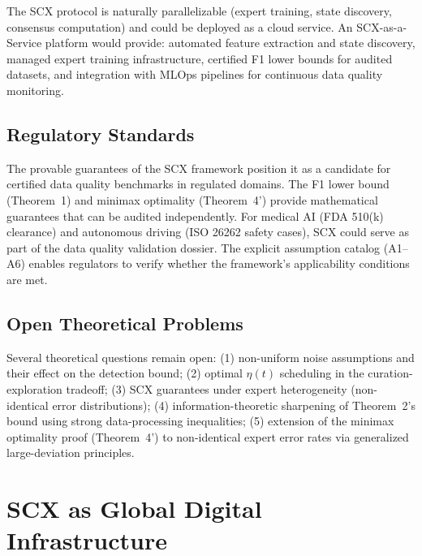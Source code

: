 \documentclass[twocolumn]{article}
\theoremstyle{definition}
\begin{document}
The SCX protocol is naturally parallelizable (expert training, state discovery, consensus computation) and could be deployed as a cloud service. An SCX-as-a-Service platform would provide: automated feature extraction and state discovery, managed expert training infrastructure, certified F1 lower bounds for audited datasets, and integration with MLOps pipelines for continuous data quality monitoring.

\subsection{Regulatory Standards}

The provable guarantees of the SCX framework position it as a candidate for certified data quality benchmarks in regulated domains. The F1 lower bound (Theorem~1) and minimax optimality (Theorem~4') provide mathematical guarantees that can be audited independently. For medical AI (FDA 510(k) clearance) and autonomous driving (ISO 26262 safety cases), SCX could serve as part of the data quality validation dossier. The explicit assumption catalog (A1--A6) enables regulators to verify whether the framework's applicability conditions are met.

\subsection{Open Theoretical Problems}

Several theoretical questions remain open: (1) non-uniform noise assumptions and their effect on the detection bound; (2) optimal $\eta(t)$ scheduling in the curation-exploration tradeoff; (3) SCX guarantees under expert heterogeneity (non-identical error distributions); (4) information-theoretic sharpening of Theorem~2's bound using strong data-processing inequalities; (5) extension of the minimax optimality proof (Theorem~4') to non-identical expert error rates via generalized large-deviation principles.

\section{SCX as Global Digital Infrastructure}
\end{document}

